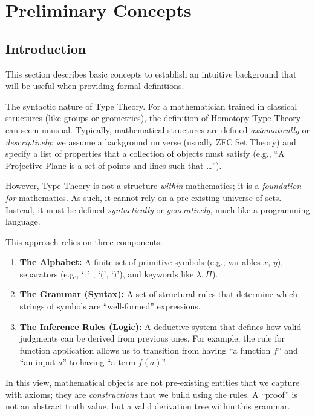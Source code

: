 \chapter{Preliminary Concepts}

\section{Introduction} This section describes basic concepts to establish an intuitive background that will be useful when providing formal definitions.

\begin{lpar}{The syntactic nature of Type Theory.}
    For a mathematician trained in classical structures (like groups or geometries), the definition of Homotopy Type Theory can seem unusual. Typically, mathematical structures are defined \textit{axiomatically} or \textit{descriptively}: we assume a background universe (usually ZFC Set Theory) and specify a list of properties that a collection of objects must satisfy (e.g., ``A Projective Plane is a set of points and lines such that \dots'').

    However, Type Theory is not a structure \textit{within} mathematics; it is a \textit{foundation for} mathematics. As such, it cannot rely on a pre-existing universe of sets. Instead, it must be defined \textsl{syntactically} or \textsl{generatively}, much like a programming language.

    This approach relies on three components:
    \begin{enumerate}
        \item \textbf{The Alphabet:} A finite set of primitive symbols (e.g., variables $x$, $y$), separators (e.g., `$:$' , `$($', `$)$'), and keywords like $\lambda, \Pi$).
        \item \textbf{The Grammar (Syntax):} A set of structural rules that determine which strings of symbols are ``well-formed'' expressions.
        \item \textbf{The Inference Rules (Logic):} A deductive system that defines how valid judgments can be derived from previous ones. For example, the rule for function application allows us to transition from having ``a function $f$'' and ``an input $a$'' to having ``a term $f(a)$''.
    \end{enumerate}

    In this view, mathematical objects are not pre-existing entities that we capture with axioms; they are \textsl{constructions} that we build using the rules. A ``proof'' is not an abstract truth value, but a valid derivation tree within this grammar.


\end{lpar}
